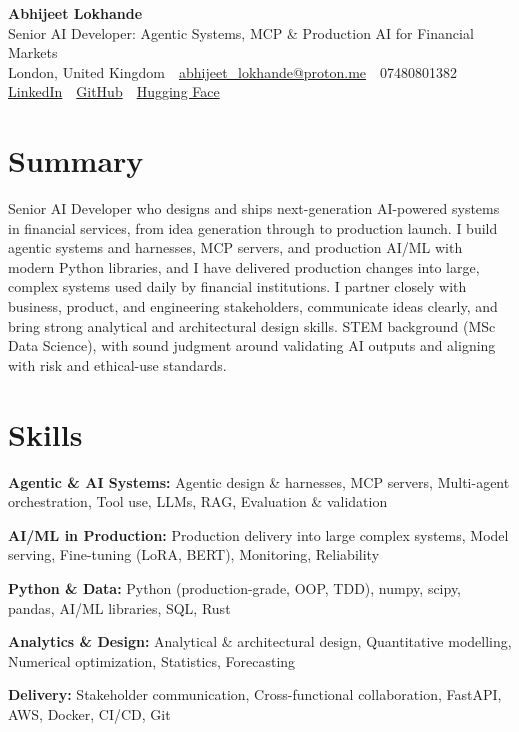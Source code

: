 \documentclass[10pt,a4paper]{article}
\newcommand{\sep}{\,\textcolor{accent!60}{\textbar}\,}
\begin{document}
\begin{center}
  {\fontsize{24}{26}\selectfont\bfseries Abhijeet Lokhande}\\[3pt]
  {\color{accent}\large Senior AI Developer: Agentic Systems, MCP \& Production AI for Financial Markets}\\[5pt]
  {\small
    London, United Kingdom \sep
    \href{mailto:abhijeet_lokhande@proton.me}{abhijeet\_lokhande@proton.me} \sep
    07480801382 \\[2pt]
    \href{https://www.linkedin.com/in/ablds/}{LinkedIn} \sep
    \href{https://github.com/abhijeetscode}{GitHub} \sep
    \href{https://huggingface.co/ab-ai}{Hugging Face}
  }
\end{center}
\vspace{2pt}

\section{Summary}
Senior AI Developer who designs and ships next-generation AI-powered systems in financial services, from idea generation through to production launch. I build agentic systems and harnesses, MCP servers, and production AI/ML with modern Python libraries, and I have delivered production changes into large, complex systems used daily by financial institutions. I partner closely with business, product, and engineering stakeholders, communicate ideas clearly, and bring strong analytical and architectural design skills. STEM background (MSc Data Science), with sound judgment around validating AI outputs and aligning with risk and ethical-use standards.

\section{Skills}
\begin{tight}
  \item[\textcolor{accent}{\small$\bullet$}] \textbf{Agentic \& AI Systems:} Agentic design \& harnesses, MCP servers, Multi-agent orchestration, Tool use, LLMs, RAG, Evaluation \& validation
  \item[\textcolor{accent}{\small$\bullet$}] \textbf{AI/ML in Production:} Production delivery into large complex systems, Model serving, Fine-tuning (LoRA, BERT), Monitoring, Reliability
  \item[\textcolor{accent}{\small$\bullet$}] \textbf{Python \& Data:} Python (production-grade, OOP, TDD), numpy, scipy, pandas, AI/ML libraries, SQL, Rust
  \item[\textcolor{accent}{\small$\bullet$}] \textbf{Analytics \& Design:} Analytical \& architectural design, Quantitative modelling, Numerical optimization, Statistics, Forecasting
  \item[\textcolor{accent}{\small$\bullet$}] \textbf{Delivery:} Stakeholder communication, Cross-functional collaboration, FastAPI, AWS, Docker, CI/CD, Git
\end{tight}
\end{document}
